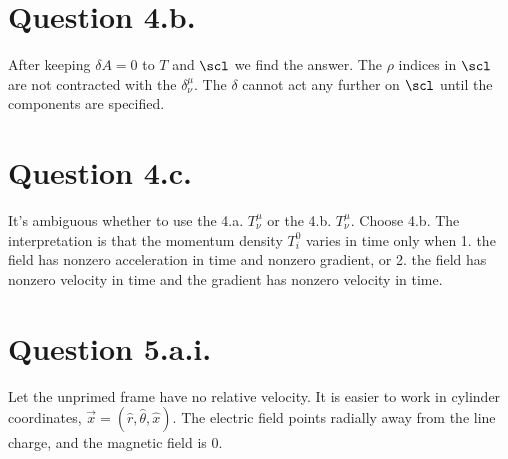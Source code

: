 \documentclass{article}
\begin{document}
\section*{Question 4.b.}
After keeping $\delta A=0$ to $T$ and $\scl$ we find the answer. The $\rho$ indices in $\scl$ are not contracted with the $\delta^\mu_\nu$. The $\delta$ cannot act any further on $\scl$ until the components are specified.
\section*{Question 4.c.}
It's ambiguous whether to use the 4.a. $T^\mu_\nu$ or the 4.b. $T^\mu_\nu$. Choose 4.b.
\e{\fr{\p}{\p(\p_0 \phi)}\scl=\fr{\p}{\p(\p_0 \phi)}(\p_0\phi^*\p^0\phi)=\p_0\phi^*}
\e{\fr{\p}{\p(\p_0 \phi^*)}\scl=\fr{\p}{\p(\p_0 \phi^*)}(\p_0\phi^*\p^0\phi)=\p_0\phi}
The interpretation is that the momentum density $T^0_i$ varies in time only when 1. the field has nonzero acceleration in time and nonzero gradient, or 2. the field has nonzero velocity in time and the gradient has nonzero velocity in time.
\section*{Question 5.a.i.}
Let the unprimed frame have no relative velocity. It is easier to work in cylinder coordinates, $\vec{x}=(\hat{r},\hat{\theta},\hat{x})$.
The electric field points radially away from the line charge, and the magnetic field is 0.
\end{document}
